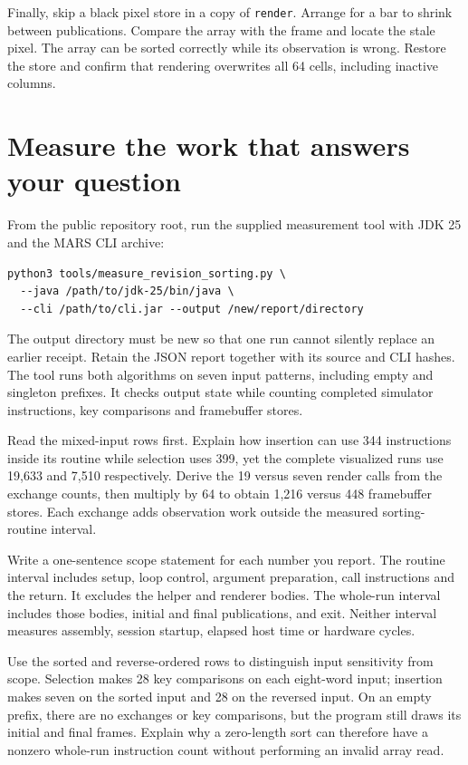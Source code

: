 Finally, skip a black pixel store in a copy of \texttt{render}. Arrange for a bar
to shrink between publications. Compare the array with the frame and locate the
stale pixel. The array can be sorted correctly while its observation is wrong.
Restore the store and confirm that rendering overwrites all 64 cells, including
inactive columns.

\section{Measure the work that answers your question}

From the public repository root, run the supplied measurement tool with JDK 25
and the MARS CLI archive:
\begin{verbatim}
python3 tools/measure_revision_sorting.py \
  --java /path/to/jdk-25/bin/java \
  --cli /path/to/cli.jar --output /new/report/directory
\end{verbatim}
The output directory must be new so that one run cannot silently replace an earlier
receipt. Retain the JSON report together with its source and CLI hashes. The tool
runs both algorithms on seven input patterns, including empty and singleton
prefixes. It checks output state while counting completed simulator instructions,
key comparisons and framebuffer stores.

Read the mixed-input rows first. Explain how insertion can use 344 instructions
inside its routine while selection uses 399, yet the complete visualized runs use
19,633 and 7,510 respectively. Derive the 19 versus seven render calls from the
exchange counts, then multiply by 64 to obtain 1,216 versus 448 framebuffer stores.
Each exchange adds observation work outside the measured sorting-routine interval.

Write a one-sentence scope statement for each number you report. The routine
interval includes setup, loop control, argument preparation, call instructions and
the return. It excludes the helper and renderer bodies. The whole-run interval
includes those bodies, initial and final publications, and exit. Neither interval
measures assembly, session startup, elapsed host time or hardware cycles.

Use the sorted and reverse-ordered rows to distinguish input sensitivity from
scope. Selection makes 28 key comparisons on each eight-word input; insertion
makes seven on the sorted input and 28 on the reversed input. On an empty prefix,
there are no exchanges or key comparisons, but the program still draws its initial
and final frames. Explain why a zero-length sort can therefore have a nonzero
whole-run instruction count without performing an invalid array read.


